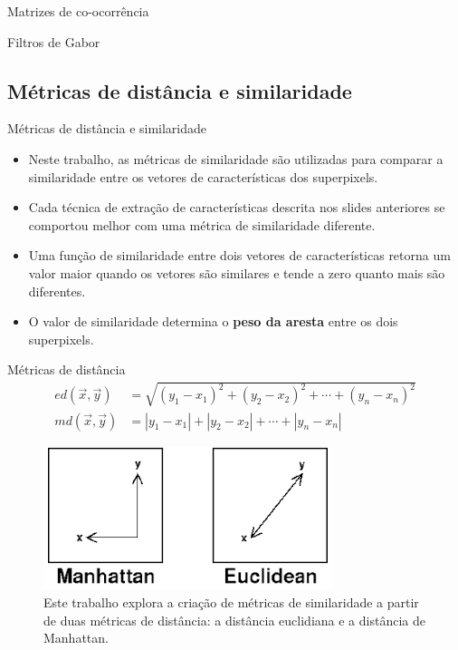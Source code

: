 \documentclass{templatebeamerufc/libs/ufc_format}
\begin{document}
\begin{frame}{Matrizes de co-ocorrência}
\end{frame}
\begin{frame}{Filtros de Gabor}
\end{frame}

\subsection{Métricas de distância e similaridade}

\begin{frame}{Métricas de distância e similaridade}
\begin{itemize}
  \item Neste trabalho, as métricas de similaridade são utilizadas para comparar a
similaridade entre os vetores de características dos superpixels.
  \item Cada técnica de extração de características descrita nos
slides anteriores se comportou melhor com uma métrica de similaridade
diferente.
  \item Uma função de similaridade entre dois vetores de
características retorna um valor maior quando os vetores são similares
e tende a zero quanto mais são diferentes.
 \item O valor de similaridade determina o \textbf{peso da aresta} entre os dois superpixels.
\end{itemize}
\end{frame}

\begin{frame}{Métricas de distância}
  \begin{equation*}\label{eq:distancias}
    \begin{aligned}
      ed(\vec{x}, \vec{y}) &= \sqrt{{(y_1-x_1)}^2 + {(y_2-x_2)}^2 + \cdots + {(y_n-x_n)}^2} \\
      md(\vec{x}, \vec{y}) &= |y_1-x_1| + |y_2-x_2| + \cdots + |y_n-x_n|
    \end{aligned}
  \end{equation*}
  \begin{figure}[!h]
    \centering
    \caption{
      Este trabalho explora a criação de métricas de similaridade a
      partir de duas métricas de distância: a distância euclidiana e a
      distância de Manhattan.
    }
    \includegraphics[scale=0.5]{figuras/manhattan-vs-euclidean}
  \end{figure}
\end{frame}
\end{document}
